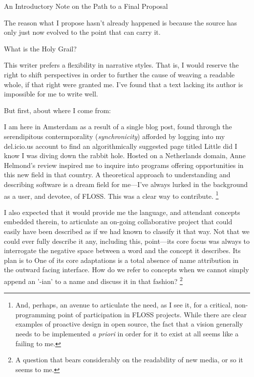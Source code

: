 \usemodule[simplefonts]

\setuppapersize[A4]

\setupwhitespace[medium]

\setuppagenumbering[location={footer,left,margin}]

\setupcolors[state=start]
\setupinteraction[state=start,color=darkblue]

{\tfd An Introductory Note on the Path to a Final Proposal}

The reason what I propose hasn't already happened is because the source has only
just now evolved to the point that can carry it.

\subject{The Holy Grail}

\startitemize
\item
  What is the Holy Grail?
\stopitemize

\subject{Self Injection}

This writer prefers a flexibility in narrative styles. That is, I
would reserve the right to shift perspectives in order to further
the cause of weaving a readable whole, if that right were granted
me. I've found that a text lacking its author is impossible for me
to write well.

But first, about where I come from:

I am here in Amsterdam as a result of a single blog post, found
through the serendipitous contermporality ({\em synchronicity})
afforded by logging into my del.icio.us account to find an
algorithmically suggested page titled
Little did I know I was diving down the rabbit hole. Hosted on a
Netherlands domain, Anne Helmond's review inspired me to inquire
into programs offering opportunities in this new field in that
country. A theoretical approach to understanding and describing
software is a dream field for me---I've always lurked in the
background as a user, and devotee, of FLOSS. This was a clear way
to contribute.
\footnote{And, perhaps, an avenue to articulate the need, as I see it, for a
critical, non-programming point of participation in FLOSS projects.
While there are clear examples of proactive design in open source,
the fact that a vision generally needs to be implemented
{\em a priori} in order for it to exist at all seems like a failing
to me.}

I also expected that it would provide me the language, and
attendant concepts embedded therein, to articulate an on-going
collaborative project that could easily have been described as
 if we had known to classify it that way. Not
that we could ever fully describe it any, including this,
point---its core focus was always to interrogate the negative space
between a word and the concept it describes. Its plan is to One of
its core adaptations is a total absence of name attribution in the
outward facing interface. How do we refer to concepts when we
cannot simply append an '-ian' to a name and discuss it in that
fashion?
\footnote{A question that bears considerably on the readability of new media,
or so it seems to me.}

